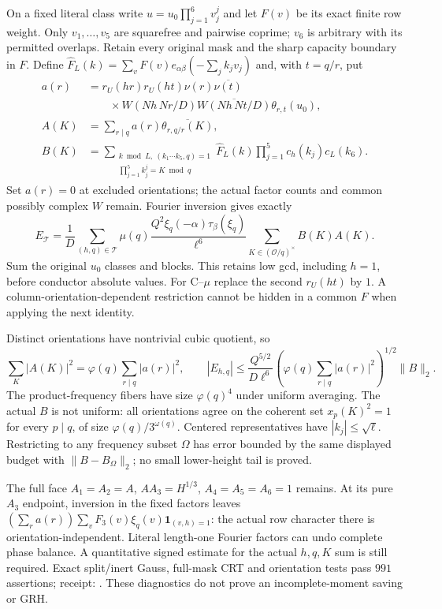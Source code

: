 \documentclass[11pt]{article}
\theoremstyle{definition}\newtheorem{definition}[theorem]{Definition}
\theoremstyle{remark}\newtheorem{remark}[theorem]{Remark}
\begin{document}
On a fixed literal class write $u=u_0\prod_{j=1}^6v_j^j$ and let $F(v)$
be its exact finite row weight. Only $v_1,\ldots,v_5$ are squarefree and
pairwise coprime; $v_6$ is arbitrary with its permitted overlaps.
Retain every original mask and the sharp capacity boundary in $F$.
Define $\widehat F_L(k)=\sum_vF(v)e_{\alpha\beta}(-\sum_jk_jv_j)$ and,
with $t=q/r$, put
\begin{align*}
 a(r)&=r_U(hr)r_U(ht)\nu(r)\overline{\nu(t)}\\
 &\qquad{}\times W(Nh\,Nr/D)\overline{W(Nh\,Nt/D)}\theta_{r,t}(u_0),\\
 A(K)&=\sum_{r\mid q}a(r)\overline{\theta_{r,q/r}(K)},\\
 B(K)&=\sum_{\substack{k\bmod L,\ (k_1\cdots k_5,q)=1\\
                   \prod_{j=1}^5k_j^j=K\bmod q}}
       \widehat F_L(k)\prod_{j=1}^5c_h(k_j)c_L(k_6).
\end{align*}
Set $a(r)=0$ at excluded orientations; the actual factor counts and
common possibly complex $W$ remain. Fourier inversion gives exactly
\begin{equation}\label{jdq:joint}
 E_{\mathcal T}=\frac1D\sum_{(h,q)\in\mathcal T}
 \mu(q)\frac{Q^2\xi_q(-\alpha)\tau_\beta(\xi_q)}{\ell^6}
 \sum_{K\in(\mathcal O/q)^\times}B(K)A(K).
\end{equation}
Sum the original $u_0$ classes and blocks. This retains low gcd,
including $h=1$, before conductor absolute values. For C--$\mu$ replace
the second $r_U(ht)$ by $1$. A column-orientation-dependent restriction
cannot be hidden in a common $F$ when applying the next identity.

Distinct orientations have nontrivial cubic quotient, so
\[
 \sum_K|A(K)|^2=\varphi(q)\sum_{r\mid q}|a(r)|^2,\qquad
 |E_{h,q}|\le\frac{Q^{5/2}}{D\ell^6}
  \left(\varphi(q)\sum_{r\mid q}|a(r)|^2\right)^{1/2}\|B\|_2.
\]
The product-frequency fibers have size $\varphi(q)^4$ under uniform
averaging. The actual $B$ is not uniform: all orientations agree on
the coherent set $x_p(K)^2=1$ for every $p\mid q$, of size
$\varphi(q)/3^{\omega(q)}$. Centered representatives have
$|k_j|\le\sqrt\ell$. Restricting to any frequency subset $\Omega$ has
error bounded by the same displayed budget with $\|B-B_\Omega\|_2$;
no small lower-height tail is proved.

The full face $A_1=A_2=A$, $AA_3=H^{1/3}$, $A_4=A_5=A_6=1$ remains.
At its pure $A_3$ endpoint, inversion in the fixed factors leaves
$(\sum_ra(r))\sum_vF_3(v)\xi_q(v)\mathbf1_{(v,h)=1}$:
the actual row character there is orientation-independent. Literal
length-one Fourier factors can undo complete phase balance.
A quantitative signed estimate for the actual $h,q,K$ sum is still
required. Exact split/inert Gauss, full-mask CRT and orientation tests
pass $991$ assertions; receipt:
.
These diagnostics do not prove an incomplete-moment saving or GRH.
\end{document}
